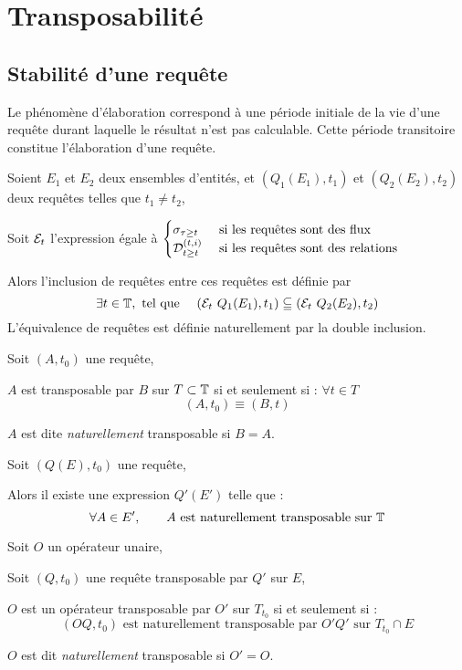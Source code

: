 \section{Transposabilité}
\subsection{Stabilité d'une requête}
\begin{defi}
    Le phénomène d'élaboration correspond à une période initiale de la vie d'une requête durant laquelle le résultat n'est pas calculable. Cette période transitoire constitue l'élaboration d'une requête.
\end{defi}

\begin{defi}
    Soient $E_1$ et $E_2$ deux ensembles d'entités, et $(Q_1(E_1),t_1)$ et $(Q_2(E_2),t_2)$ deux requêtes telles que $t_1 \neq t_2$,

    Soit $\mathcal{E}_t$ l'expression égale à $\begin{cases} \sigma_{\tau\geq t} & \textrm{ si les requêtes sont des flux}\\ \mathcal{D}_{t\geq t}^{(t,i)} & \textrm{  si les requêtes sont des relations}\end{cases}$

    Alors l'inclusion de requêtes entre ces requêtes est définie par $$\exists t \in \mathbb{T}, \textrm{ tel que } \quad (\mathcal{E}_t\ Q_1(E_1), t_1) \subseteqq (\mathcal{E}_t\  Q_2(E_2), t_2)$$
    L'équivalence de requêtes est définie naturellement par la double inclusion.
\end{defi}

\begin{defi}
    Soit $(A,t_0)$ une requête,

    $A$ est transposable par $B$ sur $T\subset \mathbb{T}$ si et seulement si : $\forall t\in T$ $$(A,t_0) \equiv (B,t)$$

    $A$ est dite \textit{naturellement} transposable si $B=A$.
\end{defi}

\begin{hyp}
    Soit $(Q(E),t_0)$ une requête,

    Alors il existe une expression $Q'(E')$ telle que : $$\forall A\in E', \qquad A \textrm{ est naturellement transposable sur } \mathbb{T}$$
\end{hyp}

\begin{defi}
    Soit $O$ un opérateur unaire,

    Soit $(Q,t_0)$ une requête transposable par $Q'$ sur $E$,

    $O$ est un opérateur transposable par $O'$ sur $T_{t_0}$ si et seulement si : $$(OQ,t_0) \textrm{ est naturellement transposable par } O'Q' \textrm{ sur } T_{t_0}\cap E$$

    $O$ est dit \textit{naturellement} transposable si $O'=O$.
\end{defi}
